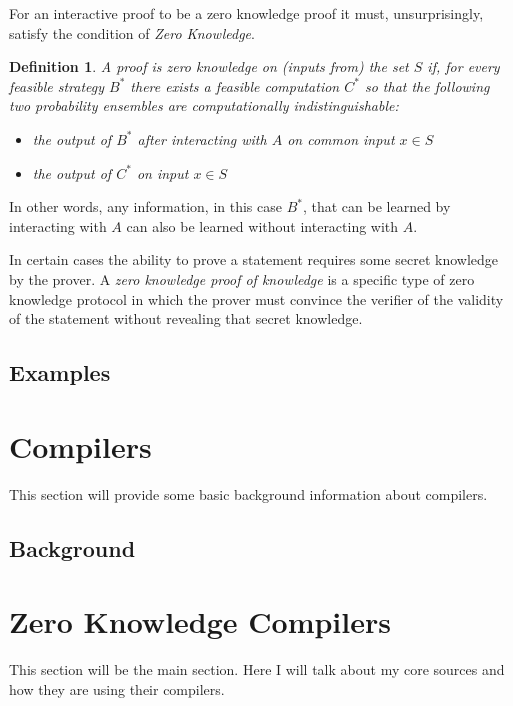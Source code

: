 \documentclass{sig-alternate}
\newtheorem{zeroKnowledge}{Definition}
\begin{document}
		For an interactive proof to be a zero knowledge proof it must, unsurprisingly,
		satisfy the condition of \textit{Zero Knowledge}.		
		
		\begin{zeroKnowledge}
			A proof is zero knowledge on (inputs from) the set $S$ if, for every feasible
			strategy $B^{*}$ there exists a feasible computation $C^{*}$ so that the
			following two probability ensembles are computationally indistinguishable:
			
			\begin{itemize}
				\item the output of $B^{*}$ after interacting with $A$ on common input
				$x \in S$
				
				\item the output of $C^{*}$ on input $x \in S$
			\end{itemize}						
			
		\end{zeroKnowledge}
		
		In other words, any information, in this case $B^{*}$, that can be learned by
		interacting with $A$ can also be learned without interacting with
		$A$.~\cite{Survey}
		
		In certain cases the ability to prove a statement requires some secret knowledge
		by the prover. A \textit{zero knowledge proof of knowledge} is a specific type
		of zero knowledge protocol in which the prover must convince the verifier
		of the validity of the statement without	revealing that secret knowledge.
		\cite{Wiki}

	\subsection{Examples}


\section{Compilers}
	This section will provide some basic background information about compilers.

	\subsection{Background}
	

\section{Zero Knowledge Compilers}
	This section will be the main section. Here I will talk about my core sources and
	how they are using their compilers.
\end{document}

